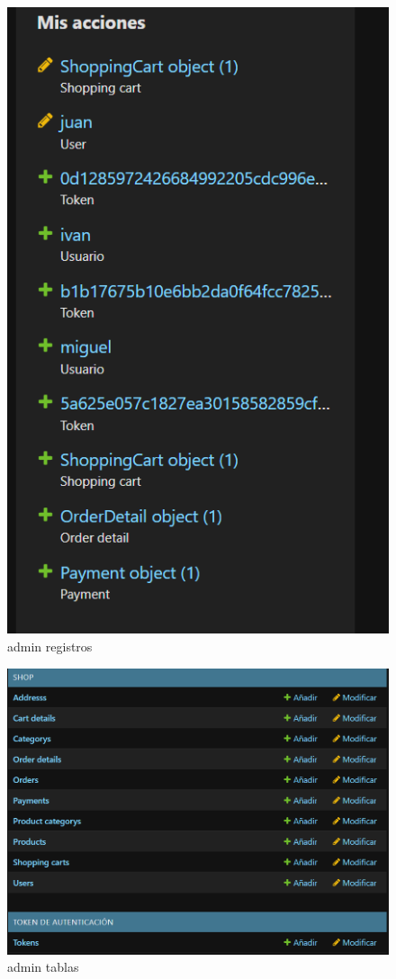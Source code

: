 \documentclass[conference]{IEEEtran}
\begin{document}
\begin{figure}[htbp]
    \centering
    \includegraphics[width=\linewidth]{img/admin2.png}
    \caption{admin registros}
    \label{fig:etiqueta}
\end{figure}

\begin{figure}[htbp]
    \centering
    \includegraphics[width=\linewidth]{img/admin3.png}
    \caption{admin tablas}
    \label{fig:etiqueta}
\end{figure}
\end{document}
